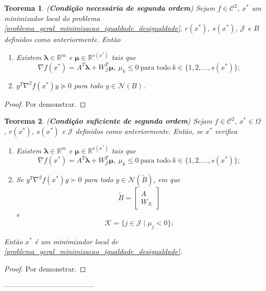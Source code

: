 \documentclass[12pt,a4paper]{scrartcl}
\def\RR{\mathds{R}}
\newtheorem{teo}{Teorema}
\theoremstyle{definition}%
\begin{document}
\begin{teo}(\textbf{Condição necessária de segunda ordem}) \label{teo:condicao_necessaria_2ordem_igualdade_desigualdade}
Sejam $f \in \mathcal{C}^{2}$, $x^{*}$ um minimizador local do problema \eqref{problema_geral_minimizacao_igualdade_desigualdade}, $r(x^{*})$, $s(x^{*})$, $\mathcal{J}$ e $B$ definidos como anteriormente. Então
\begin{enumerate}
	\item[(i)] Existem $\boldsymbol{\lambda} \in \RR^{m}$ e $\boldsymbol{\mu} \in \RR^{s(x^{*})}$ tais que 
	\[
	\nabla f(x^{*}) = A^{T}\boldsymbol{\lambda} + W^{T}_{\mathcal{J}} \boldsymbol{\mu}, \ \mu_{k} \leq 0 \ \text{para todo} \ k\in \{ 1,2, \ldots , s(x^{*}) \} ;
	\]
	\item[(ii)] $y^{T}\nabla^{2} f(x^{*})y \succcurlyeq 0$ para todo $y\in \mathcal{N}(B)$.
\end{enumerate}	
\end{teo}
\begin{proof}
Por demonstrar.
\end{proof}


\begin{teo}(\textbf{Condição suficiente de segunda ordem}) \label{teo:condicao_suficiente_igualdade_desigualdade}
Sejam $f\in \mathcal{C}^{2}$, $x^{*} \in \Omega$, $r(x^{*})$, $s(x^{*})$ e $\mathcal{J}$ definidos como anteriormente. Então, se $x^{*}$ verifica
\begin{enumerate}
	\item[(i)] Existem $\boldsymbol{\lambda} \in \RR^{m}$ e $\boldsymbol{\mu} \in \RR^{s(x^{*})}$ tais que 
	\[
	\nabla f(x^{*}) = A^{T}\boldsymbol{\lambda} + W^{T}_{\mathcal{J}} \boldsymbol{\mu}, \ \mu_{k} \leq 0 \ \text{para todo} \ k\in \{ 1,2, \ldots , s(x^{*}) \} ;
	\]
	\item[(ii)] Se $y^{T}\nabla^{2} f(x^{*})y \succ 0$ para todo $y\in \mathcal{N}(\tilde{B})$, em que
	\[
	\tilde{B} = \begin{bmatrix*} A \\ W_{\mathcal{K}} \end{bmatrix*} 
	\]
	e
	\[
	\mathcal{K} = \{ j\in \mathcal{J} \mid \mu_{j} <0 \};
	\]
\end{enumerate}
Então $x^{*}$ é um minimizador local de \eqref{problema_geral_minimizacao_igualdade_desigualdade}.
\end{teo}
\begin{proof}
Por demonstrar.
\end{proof}


--------------------------------------
\end{document}
